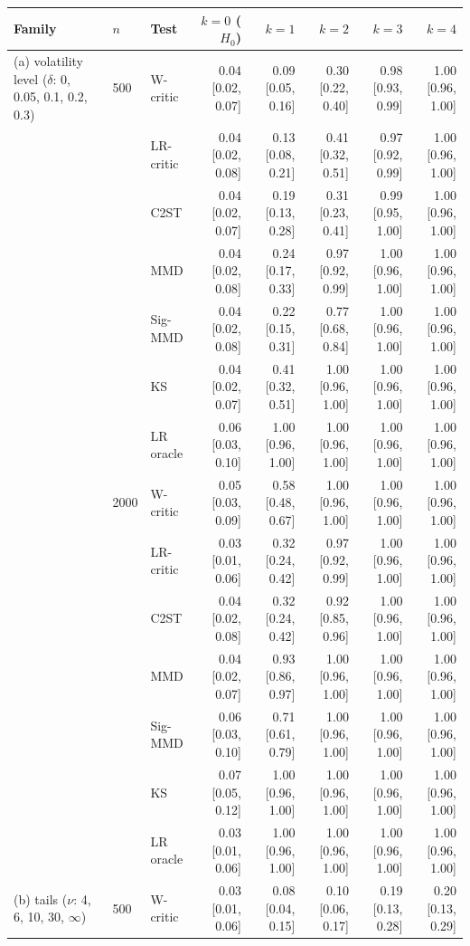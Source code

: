 \begin{tabular}{lllrrrrr}
\toprule
Family & $n$ & Test & $k=0$ ($H_0$) & $k=1$ & $k=2$ & $k=3$ & $k=4$ \\
\midrule
(a) volatility level ($\delta$: 0, 0.05, 0.1, 0.2, 0.3) & 500 & W-critic & 0.04 [0.02, 0.07] & 0.09 [0.05, 0.16] & 0.30 [0.22, 0.40] & 0.98 [0.93, 0.99] & 1.00 [0.96, 1.00] \\
 &  & LR-critic & 0.04 [0.02, 0.08] & 0.13 [0.08, 0.21] & 0.41 [0.32, 0.51] & 0.97 [0.92, 0.99] & 1.00 [0.96, 1.00] \\
 &  & C2ST & 0.04 [0.02, 0.07] & 0.19 [0.13, 0.28] & 0.31 [0.23, 0.41] & 0.99 [0.95, 1.00] & 1.00 [0.96, 1.00] \\
 &  & MMD & 0.04 [0.02, 0.08] & 0.24 [0.17, 0.33] & 0.97 [0.92, 0.99] & 1.00 [0.96, 1.00] & 1.00 [0.96, 1.00] \\
 &  & Sig-MMD & 0.04 [0.02, 0.08] & 0.22 [0.15, 0.31] & 0.77 [0.68, 0.84] & 1.00 [0.96, 1.00] & 1.00 [0.96, 1.00] \\
 &  & KS & 0.04 [0.02, 0.07] & 0.41 [0.32, 0.51] & 1.00 [0.96, 1.00] & 1.00 [0.96, 1.00] & 1.00 [0.96, 1.00] \\
 &  & LR oracle & 0.06 [0.03, 0.10] & 1.00 [0.96, 1.00] & 1.00 [0.96, 1.00] & 1.00 [0.96, 1.00] & 1.00 [0.96, 1.00] \\
 & 2000 & W-critic & 0.05 [0.03, 0.09] & 0.58 [0.48, 0.67] & 1.00 [0.96, 1.00] & 1.00 [0.96, 1.00] & 1.00 [0.96, 1.00] \\
 &  & LR-critic & 0.03 [0.01, 0.06] & 0.32 [0.24, 0.42] & 0.97 [0.92, 0.99] & 1.00 [0.96, 1.00] & 1.00 [0.96, 1.00] \\
 &  & C2ST & 0.04 [0.02, 0.08] & 0.32 [0.24, 0.42] & 0.92 [0.85, 0.96] & 1.00 [0.96, 1.00] & 1.00 [0.96, 1.00] \\
 &  & MMD & 0.04 [0.02, 0.07] & 0.93 [0.86, 0.97] & 1.00 [0.96, 1.00] & 1.00 [0.96, 1.00] & 1.00 [0.96, 1.00] \\
 &  & Sig-MMD & 0.06 [0.03, 0.10] & 0.71 [0.61, 0.79] & 1.00 [0.96, 1.00] & 1.00 [0.96, 1.00] & 1.00 [0.96, 1.00] \\
 &  & KS & 0.07 [0.05, 0.12] & 1.00 [0.96, 1.00] & 1.00 [0.96, 1.00] & 1.00 [0.96, 1.00] & 1.00 [0.96, 1.00] \\
 &  & LR oracle & 0.03 [0.01, 0.06] & 1.00 [0.96, 1.00] & 1.00 [0.96, 1.00] & 1.00 [0.96, 1.00] & 1.00 [0.96, 1.00] \\
(b) tails ($\nu$: 4, 6, 10, 30, $\infty$) & 500 & W-critic & 0.03 [0.01, 0.06] & 0.08 [0.04, 0.15] & 0.10 [0.06, 0.17] & 0.19 [0.13, 0.28] & 0.20 [0.13, 0.29] \\

\end{tabular}
